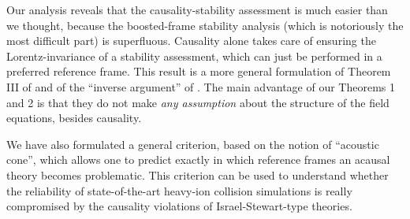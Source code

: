 \documentclass[a4paper, amsfonts, amssymb, amsmath, reprint, showkeys,  twoside, onecolumn,notitlepage,nofootinbib]{revtex4-1}
\theoremstyle{definition}
\theoremstyle{theorem}
\begin{document}

Our analysis reveals that the causality-stability assessment is much easier than we thought, because the boosted-frame stability analysis (which is notoriously the most difficult part) is superfluous. Causality alone takes care of ensuring the Lorentz-invariance of a stability assessment, which can just be performed in a preferred reference frame. This result is a more general formulation of Theorem III of \citet{BemficaDNDefinitivo2020} and of the ``inverse argument'' of \citet{GavassinoCausality2021}. The main advantage of our Theorems 1 and 2 is that they do not make \textit{any assumption} about the structure of the field equations, besides causality.


We have also formulated a general criterion, based on the notion of ``acoustic cone'', which allows one to predict exactly in which reference frames an acausal theory becomes problematic. This criterion can be used to understand whether the reliability of state-of-the-art heavy-ion collision simulations \cite{Plumberg2021} is really compromised by the causality violations of Israel-Stewart-type theories. 

\end{document}
